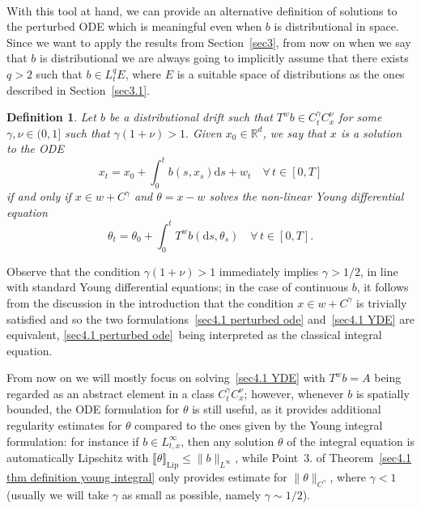 \documentclass[10pt]{article}
\newcommand{\mathd}{\mathrm{d}}
\newcommand{\tmop}[1]{\ensuremath{\operatorname{#1}}}
\newtheorem{definition}{Definition}
\begin{document}
\

With this tool at hand, we can provide an alternative definition of
solutions to the perturbed ODE which is meaningful even when $b$ is
distributional in space. Since we want to apply the results from
Section~\ref{sec3}, from now on when we say that $b$ is distributional we are
always going to implicitly assume that there exists $q > 2$ such that $b \in
L^q_t E$, where $E$ is a suitable space of distributions as the ones described
in Section~\ref{sec3.1}.

\begin{definition}
  \label{sec4.1 defn solution}Let $b$ be a distributional drift such that $T^w
  b \in C^{\gamma}_t C_x^{\nu}$ for some $\gamma, \nu \in (0, 1]$ such that
  $\gamma (1 + \nu) > 1.$ Given $x_0 \in \mathbb{R}^d$, we say that $x$ is a
  solution to the ODE
  \begin{equation}
    x_t = x_0 + \int_0^t b (s, x_s) \mathd s + w_t \quad \forall \, t \in [0,
    T] \label{sec4.1 perturbed ode}
  \end{equation}
  if and only if $x \in w + C^{\gamma}$ and $\theta = x - w$ solves the
  non-linear Young differential equation
  \begin{equation}
    \theta_t = \theta_0 + \int_0^t T^w b (\mathd s, \theta_s) \quad \forall \,
    t \in [0, T] . \label{sec4.1 YDE}
  \end{equation}
\end{definition}

Observe that the condition $\gamma (1 + \nu) > 1$ immediately implies $\gamma
> 1 / 2$, in line with standard Young differential equations; in the case of
continuous $b$, it follows from the discussion in the introduction that the
condition $x \in w + C^{\gamma}$ is trivially satisfied and so the two
formulations~{\eqref{sec4.1 perturbed ode}} and~{\eqref{sec4.1 YDE}} are
equivalent, {\eqref{sec4.1 perturbed ode}}~being interpreted as the classical
integral equation.

\begin{remark}
  From now on we will mostly focus on solving~{\eqref{sec4.1 YDE}} with $T^w b
  = A$ being regarded as an abstract element in a class $C^{\gamma}_t
  C^{\nu}_x$; however, whenever $b$ is spatially bounded, the ODE formulation
  for $\theta$ is still useful, as it provides additional regularity estimates
  for $\theta$ compared to the ones given by the Young integral formulation:
  for instance if $b \in L^{\infty}_{t, x}$, then any solution $\theta$ of the
  integral equation is automatically Lipschitz with $\llbracket \theta
  \rrbracket_{\tmop{Lip}} \leqslant \| b \|_{L^{\infty}}$, while Point~3. of
  Theorem~\ref{sec4.1 thm definition young integral} only provides estimate
  for $\| \theta \|_{C^{\gamma}}$, where $\gamma < 1$ (usually we will take
  $\gamma$ as small as possible, namely $\gamma \sim 1 / 2$).
\end{remark}
\end{document}
